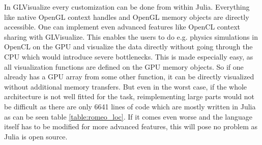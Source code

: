 In GLVisualize every customization can be done from within Julia.
Everything like native \ac{OpenGL} context handles and \ac{OpenGL} memory objects are directly accessible.
One can implement even advanced features like \ac{OpenCL} context sharing with GLVisualize\cite{OCLInterop}.
This enables the users to do e.g. physics simulations in \ac{OpenCL} on the \ac{GPU} and visualize the data directly without going through the \ac{CPU} which would introduce severe bottlenecks.
This is made especially easy, as all visualization functions are defined on the \ac{GPU} memory objects. 
So if one already has a \ac{GPU} array from some other function, it can be directly visualized without additional memory transfers.
But even in the worst case, if the whole architecture is not well fitted for the task, reimplementing large parts would not be difficult as there are only 6641 lines of code which are mostly written in Julia as can be seen table \ref{table:romeo_loc}.
If it comes even worse and the language itself has to be modified for more advanced features, this will pose no problem as Julia is open source.

